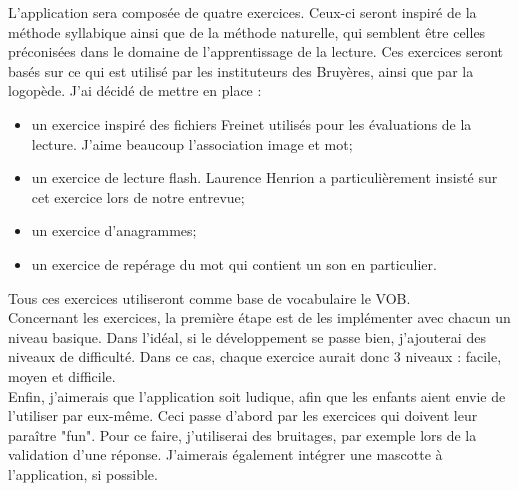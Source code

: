 L'application sera composée de quatre exercices. Ceux-ci seront inspiré de la méthode syllabique ainsi que de la méthode naturelle, qui semblent être celles préconisées dans le domaine de l'apprentissage de la lecture. Ces exercices seront basés sur ce qui est utilisé par les instituteurs des Bruyères, ainsi que par la logopède. J'ai décidé de mettre en place :
\begin{itemize}
\item un exercice inspiré des fichiers Freinet utilisés pour les évaluations de la lecture. J'aime beaucoup l'association image et mot;
\item un exercice de lecture flash. Laurence Henrion a particulièrement insisté sur cet exercice lors de notre entrevue;
\item un exercice d'anagrammes;
\item un exercice de repérage du mot qui contient un son en particulier.
\end{itemize}
Tous ces exercices utiliseront comme base de vocabulaire le VOB.\\

Concernant les exercices, la première étape est de les implémenter avec chacun un niveau basique. Dans l'idéal, si le développement se passe bien, j'ajouterai des niveaux de difficulté. Dans ce cas, chaque exercice aurait donc 3 niveaux : facile, moyen et difficile.\\

Enfin, j'aimerais que l'application soit ludique, afin que les enfants aient envie de l'utiliser par eux-même. Ceci passe d'abord par les exercices qui doivent leur paraître "fun". Pour ce faire, j'utiliserai des bruitages, par exemple lors de la validation d'une réponse. J'aimerais également intégrer une mascotte à l'application, si possible.